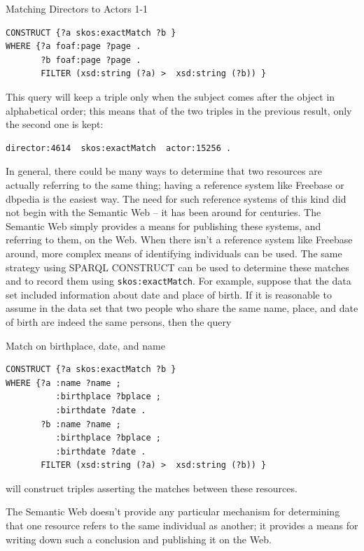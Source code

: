 \begin{challenge}
\begin{query}Matching Directors to Actors 1-1\end{query}
\begin{lstlisting}
CONSTRUCT {?a skos:exactMatch ?b }
WHERE {?a foaf:page ?page .
       ?b foaf:page ?page .
       FILTER (xsd:string (?a) >  xsd:string (?b)) }
\end{lstlisting}


This query will keep a triple only when the subject comes after the
object in alphabetical order; this means that of the two triples in the
previous result, only the second one is kept:

\begin{lstlisting}
director:4614  skos:exactMatch  actor:15256 .
\end{lstlisting}

In general, there could be many ways to determine that two resources are
actually referring to the same thing; having a reference system like
Freebase or dbpedia is the easiest way. The need for such reference systems of this
kind did not begin with the Semantic Web -- it has been around for
centuries. The Semantic Web simply provides a means for publishing these
systems, and referring to them, on the Web. When there isn't a reference
system like Freebase around, more complex means of identifying
individuals can be used. The same strategy using SPARQL CONSTRUCT can be
used to determine these matches and to record them using
\texttt{skos:exactMatch}. For example, suppose that the data set included
information about date and place of birth. If it is reasonable to assume
in the data set that two people who share the same name, place, and date
of birth are indeed the same persons, then the query

\begin{query}Match on birthplace, date, and name\end{query}
\begin{lstlisting}
CONSTRUCT {?a skos:exactMatch ?b }
WHERE {?a :name ?name ;
          :birthplace ?bplace ;
          :birthdate ?date .
       ?b :name ?name ;
          :birthplace ?bplace ;
          :birthdate ?date .
       FILTER (xsd:string (?a) >  xsd:string (?b)) }
\end{lstlisting}

will construct triples asserting the matches between these resources.

The Semantic Web doesn't provide any particular mechanism for
determining that one resource refers to the same individual as another;
it provides a means for writing down such a conclusion and publishing it
on the Web.


\end{challenge}
